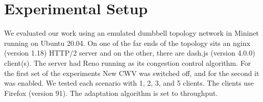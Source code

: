 \documentclass[10pt,sigconf]{acmart}
\newcommand{\todo}[1]{\textbf{\textcolor{red}{To do: #1}}}
\begin{document}







\section{Experimental Setup}

We evaluated our work using an emulated dumbbell topology network in Mininet running on Ubuntu 20.04. On one of the far ends of the topology sits an nginx (version 1.18) HTTP/2 server and on the other, there are dash.js (version 4.0.0) client(s). The server had Reno running as its congestion control algorithm. For the first set of the experiments New CWV was switched off, and for the second it was enabled. We tested each scenario with 1, 2, 3, and 5 clients.  The clients use Firefox (version 91). The adaptation algorithm is set to throughput. 
\end{document}
